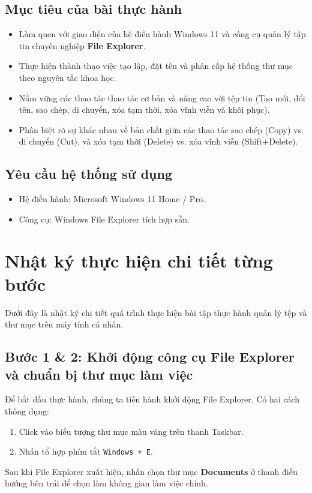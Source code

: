 \documentclass[12pt,a4paper]{article}
\begin{document}
\subsection{Mục tiêu của bài thực hành}
\begin{itemize}
    \item Làm quen với giao diện của hệ điều hành Windows 11 và công cụ quản lý tập tin chuyên nghiệp \textbf{File Explorer}.
    \item Thực hiện thành thạo việc tạo lập, đặt tên và phân cấp hệ thống thư mục theo nguyên tắc khoa học.
    \item Nắm vững các thao tác thao tác cơ bản và nâng cao với tệp tin (Tạo mới, đổi tên, sao chép, di chuyển, xóa tạm thời, xóa vĩnh viễn và khôi phục).
    \item Phân biệt rõ sự khác nhau về bản chất giữa các thao tác sao chép (Copy) vs. di chuyển (Cut), và xóa tạm thời (Delete) vs. xóa vĩnh viễn (Shift+Delete).
\end{itemize}

\subsection{Yêu cầu hệ thống sử dụng}
\begin{itemize}
    \item Hệ điều hành: Microsoft Windows 11 Home / Pro.
    \item Công cụ: Windows File Explorer tích hợp sẵn.
\end{itemize}

\newpage
\section{Nhật ký thực hiện chi tiết từng bước}
Dưới đây là nhật ký chi tiết quá trình thực hiện bài tập thực hành quản lý tệp và thư mục trên máy tính cá nhân.

\subsection{Bước 1 \& 2: Khởi động công cụ File Explorer và chuẩn bị thư mục làm việc}
Để bắt đầu thực hành, chúng ta tiến hành khởi động File Explorer. Có hai cách thông dụng:
\begin{enumerate}
    \item Click vào biểu tượng thư mục màu vàng trên thanh Taskbar.
    \item Nhấn tổ hợp phím tắt \texttt{Windows + E}.
\end{enumerate}
Sau khi File Explorer xuất hiện, nhấn chọn thư mục \textbf{Documents} ở thanh điều hướng bên trái để chọn làm không gian làm việc chính.
\end{document}
